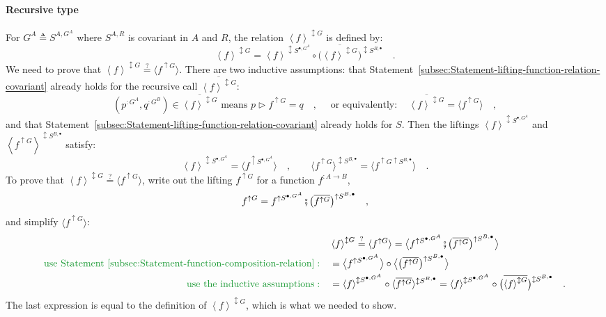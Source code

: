 \paragraph{Recursive type}

For $G^{A}\triangleq S^{A,G^{A}}$ where $S^{A,R}$ is covariant in
$A$ and $R$, the relation $\left<f\right>^{\updownarrow G}$ is
defined by:
\[
\left<f\right>^{\updownarrow G}=\left<f\right>^{\updownarrow S^{\bullet,G^{A}}}\circ\big(\overline{\left<f\right>^{\updownarrow G}}\big)^{\updownarrow S^{B,\bullet}}\quad.
\]
We need to prove that $\left<f\right>^{\updownarrow G}\overset{?}{=}\langle f^{\uparrow G}\rangle$.
There are two inductive assumptions: that Statement~\ref{subsec:Statement-lifting-function-relation-covariant}
already holds for the recursive call $\overline{\left<f\right>^{\updownarrow G}}$:
\[
(p^{:G^{A}},q^{:G^{B}})\in\overline{\left<f\right>^{\updownarrow G}}\text{ means }p\triangleright f^{\uparrow G}=q\quad,\quad\text{ or equivalently}:\quad\overline{\left<f\right>^{\updownarrow G}}=\langle f^{\uparrow G}\rangle\quad,
\]
and that Statement~\ref{subsec:Statement-lifting-function-relation-covariant}
already holds for $S$. Then the liftings $\left<f\right>^{\updownarrow S^{\bullet,G^{A}}}$
and $\left<f^{\uparrow G}\right>^{\updownarrow S^{B,\bullet}}$ satisfy:
\[
\left<f\right>^{\updownarrow S^{\bullet,G^{A}}}=\langle f^{\uparrow S^{\bullet,G^{A}}}\rangle\quad,\quad\quad\langle f^{\uparrow G}\rangle^{\updownarrow S^{B,\bullet}}=\langle f^{\uparrow G\uparrow S^{B,\bullet}}\rangle\quad.
\]
To prove that $\left<f\right>^{\updownarrow G}\overset{?}{=}\langle f^{\uparrow G}\rangle$,
write out the lifting $f^{\uparrow G}$ for a function $f^{:A\rightarrow B}$,
\[
f^{\uparrow G}=f^{\uparrow S^{\bullet,G^{A}}}\bef\big(\overline{f^{\uparrow G}}\big)^{\uparrow S^{B,\bullet}}\quad,
\]
and simplify $\langle f^{\uparrow G}\rangle$:
\begin{align*}
 & \left<f\right>^{\updownarrow G}\overset{?}{=}\langle f^{\uparrow G}\rangle=\big\langle f^{\uparrow S^{\bullet,G^{A}}}\bef\big(\overline{f^{\uparrow G}}\big)^{\uparrow S^{B,\bullet}}\big\rangle\\
{\color{greenunder}\text{use Statement~\ref{subsec:Statement-function-composition-relation}}:}\quad & =\big\langle f^{\uparrow S^{\bullet,G^{A}}}\big\rangle\circ\big\langle\big(\overline{f^{\uparrow G}}\big)^{\uparrow S^{B,\bullet}}\big\rangle\\
{\color{greenunder}\text{use the inductive assumptions}:}\quad & =\left<f\right>^{\updownarrow S^{\bullet,G^{A}}}\circ\langle\overline{f^{\uparrow G}}\rangle^{\updownarrow S^{B,\bullet}}=\left<f\right>^{\updownarrow S^{\bullet,G^{A}}}\circ\big(\overline{\left<f\right>^{\updownarrow G}}\big)^{\updownarrow S^{B,\bullet}}\quad.
\end{align*}
The last expression is equal to the definition of $\left<f\right>^{\updownarrow G}$,
which is what we needed to show.

